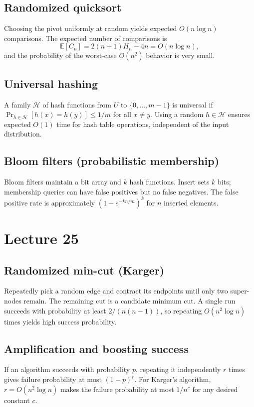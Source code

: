 \documentclass[11pt]{article}
\begin{document}
{{{{\subsection*{Randomized quicksort}
Choosing the pivot uniformly at random yields expected $O(n \log n)$ comparisons. The expected
number of comparisons is
\[
\mathbb{E}[C_n] = 2(n+1)H_n - 4n = O(n \log n),
\]
and the probability of the worst-case $O(n^2)$ behavior is very small.

\subsection*{Universal hashing}
A family $\mathcal{H}$ of hash functions from $U$ to $\{0,\ldots,m-1\}$ is universal if
\(
\Pr_{h\in\mathcal{H}}[h(x)=h(y)] \le 1/m
\) for all $x\ne y$. Using a random $h\in\mathcal{H}$ ensures expected $O(1)$ time for hash table
operations, independent of the input distribution.

\subsection*{Bloom filters (probabilistic membership)}
Bloom filters maintain a bit array and $k$ hash functions. Insert sets $k$ bits; membership
queries can have false positives but no false negatives. The false positive rate is
approximately $(1-e^{-kn/m})^k$ for $n$ inserted elements.

\section{Lecture 25}

\subsection*{Randomized min-cut (Karger)}
Repeatedly pick a random edge and contract its endpoints until only two super-nodes remain. The
remaining cut is a candidate minimum cut. A single run succeeds with probability at least
$2/(n(n-1))$, so repeating $O(n^2 \log n)$ times yields high success probability.

\subsection*{Amplification and boosting success}
If an algorithm succeeds with probability $p$, repeating it independently $r$ times gives failure
probability at most $(1-p)^r$. For Karger's algorithm, $r=O(n^2 \log n)$ makes the failure
probability at most $1/n^c$ for any desired constant $c$.

}}}}
\end{document}
